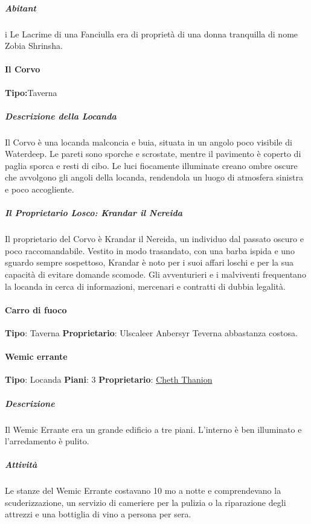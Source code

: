 \documentclass{article}
\begin{document}
                      \subparagraph{Abitant}i
                      Le Lacrime di una Fanciulla era di proprietà di una donna tranquilla di nome Zobia Shrinsha.
                  \paragraph{Il Corvo}
                  \textbf{Tipo:}Taverna
                       \subparagraph{Descrizione della Locanda}
                       Il Corvo è una locanda malconcia e buia, situata in un angolo poco visibile di Waterdeep. Le pareti sono sporche e scrostate, mentre il pavimento è coperto di paglia sporca e resti di cibo. Le luci fiocamente illuminate creano ombre oscure che avvolgono gli angoli della locanda, rendendola un luogo di atmosfera sinistra e poco accogliente.

                       \subparagraph{Il Proprietario Losco: Krandar il Nereida}
                       Il proprietario del Corvo è Krandar il Nereida, un individuo dal passato oscuro e poco raccomandabile. Vestito in modo trasandato, con una barba ispida e uno sguardo sempre sospettoso, Krandar è noto per i suoi affari loschi e per la sua capacità di evitare domande scomode. Gli avventurieri e i malviventi frequentano la locanda in cerca di informazioni, mercenari e contratti di dubbia legalità.
                  
                  \paragraph{Carro di fuoco}
                  \textbf{Tipo}: Taverna
                  \textbf{Proprietario}: Ulscaleer Anbersyr
                          Teverna abbastanza costosa.

                  \paragraph{Wemic errante}
                  \textbf{Tipo}: Locanda
                  \textbf{Piani}: 3
                  \textbf{Proprietario}: \href{https://forgottenrealms.fandom.com/wiki/Cheth_Thanion}{Cheth Thanion}
                      \subparagraph{Descrizione}
                        Il Wemic Errante era un grande edificio a tre piani. L'interno è ben illuminato e l'arredamento è pulito.
                      \subparagraph{Attività}
                        Le stanze del Wemic Errante costavano 10 mo a notte e comprendevano la scuderizzazione, un servizio di cameriere per la pulizia o la riparazione degli attrezzi e una bottiglia di vino a persona per sera.
\end{document}
